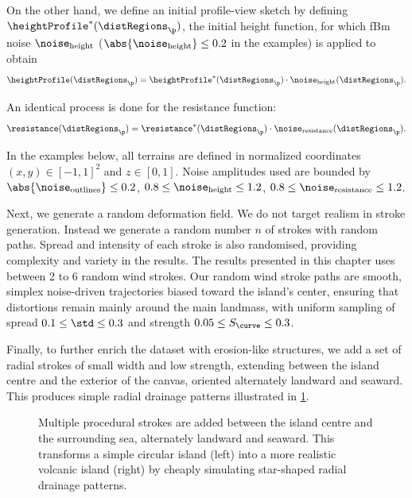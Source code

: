On the other hand, we define an initial profile-view sketch by defining $\heightProfile^*(\distRegions_\p)$, the initial height function, for which fBm noise $\noise_\text{height}$ ($\abs{\noise_\text{height}} \leq 0.2$ in the examples) is applied to obtain
\begin{align*}
    \heightProfile(\distRegions_\p) = \heightProfile^*(\distRegions_\p) \cdot \noise_\text{height}(\distRegions_\p).
\end{align*}

An identical process is done for the resistance function:
\begin{align*}
    \resistance(\distRegions_\p) = \resistance^*(\distRegions_\p) \cdot \noise_\text{resistance}(\distRegions_\p).
\end{align*}

In the examples below, all terrains are defined in normalized coordinates $(x, y) \in [-1, 1]^2$ and $z \in [0, 1]$. Noise amplitudes used are bounded by $\abs{\noise_\text{outlines}} \leq 0.2$, $0.8 \leq \noise_\text{height} \leq 1.2$, $0.8 \leq \noise_\text{resistance} \leq 1.2$.

Next, we generate a random deformation field. We do not target realism in stroke generation. Instead we generate a random number $n$ of strokes with random paths. Spread and intensity of each stroke is also randomised, providing complexity and variety in the results. The results presented in this chapter uses between 2 to 6 random wind strokes. Our random wind stroke paths are smooth, simplex noise-driven trajectories biased toward the island's center, ensuring that distortions remain mainly around the main landmass, with uniform sampling of spread $0.1 \leq \std \leq 0.3$ and strength $0.05 \leq S_\curve \leq 0.3$.

Finally, to further enrich the dataset with erosion-like structures, we add a set of radial strokes of small width and low strength, extending between the island centre and the exterior of the canvas, oriented alternately landward and seaward. This produces simple radial drainage patterns illustrated in \cref{fig:coral-island-radial-pattern-example}.

\begin{figure}
    \caption[Radial drainage inserted in our dataset generation]{Multiple procedural strokes are added between the island centre and the surrounding sea, alternately landward and seaward. This transforms a simple circular island (left) into a more realistic volcanic island (right) by cheaply simulating star-shaped radial drainage patterns.}
    \label{fig:coral-island-radial-pattern-example}
\end{figure}

